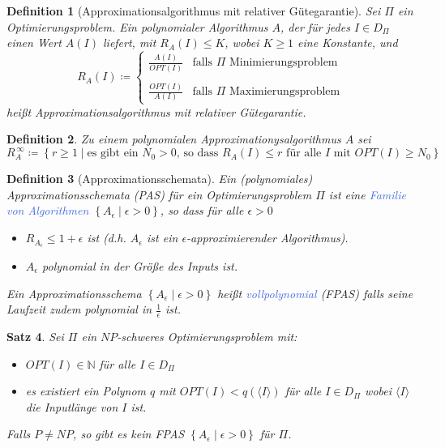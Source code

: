 \documentclass[11pt]{article}
\newcommand{\tcol}[1]{\textcolor{RoyalBlue}{#1}}
\newcommand{\set}[1]{\left\lbrace #1\right\rbrace}
\theoremstyle{break}
\newtheorem{satz}{Satz}[section]
\newtheorem{defi}[satz]{Definition}
\begin{document}
    \begin{defi}[Approximationsalgorithmus mit relativer Gütegarantie]
        Sei $\Pi$ ein Optimierungsproblem.
        Ein polynomialer Algorithmus $A$, der für jedes $I\in D_\Pi$ einen Wert $A(I)$ liefert, mit $R_A(I)\leq K$, wobei $K\geq 1$ eine Konstante, und
        \[R_A(I)\coloneqq
        \begin{cases}
            \frac{A(I)}{OPT(I)} & \text{falls $\Pi$ Minimierungsproblem}\\
            & \\
            \frac{OPT(I)}{A(I)} & \text{falls $\Pi$ Maximierungsproblem}
        \end{cases}
        \]
        heißt Approximationsalgorithmus mit relativer Gütegarantie.
    \end{defi}

    \begin{defi}
        Zu einem polynomialen Approximationysalgorithmus $A$ sei
        \[R^{\,\infty}_A\coloneqq\set{r\geq 1 \mid\text{es gibt ein $N_0>0$, so dass $R_A(I)\leq r$ für alle $I$ mit $OPT(I)\geq N_0$}}\]
    \end{defi}

    \begin{defi}[Approximationsschemata]
        Ein (polynomiales) Approximationsschemata (PAS) für ein Optimierungsproblem $\Pi$ ist eine \tcol{Familie von Algorithmen} $\set{A_\epsilon\mid\epsilon>0}$, so dass für alle $\epsilon>0$
        \begin{itemize}
            \item $R_{A_\epsilon}\leq 1+\epsilon$ ist (d.h. $A_\epsilon$ ist ein $\epsilon$-approximierender Algorithmus).
            \item $A_\epsilon$ polynomial in der Größe des Inputs ist.
        \end{itemize}
        Ein Approximationsschema $\set{A_\epsilon\mid\epsilon>0}$ heißt \tcol{vollpolynomial} (FPAS) falls seine Laufzeit zudem polynomial in $\frac{1}{\epsilon}$ ist.
    \end{defi}

    \begin{satz}
        Sei $\Pi$ ein $NP$-schweres Optimierungsproblem mit:
        \begin{itemize}
            \item $OPT(I)\in\mathbb{N}$ für alle $I\in D_\Pi$
            \item es existiert ein Polynom $q$ mit $OPT(I)<q(\langle I\rangle)$ für alle $I\in D_\Pi$ wobei $\langle I\rangle$ die Inputlänge von $I$ ist.
        \end{itemize}
        Falls $P\neq NP$, so gibt es kein FPAS $\set{A_\epsilon\mid\epsilon>0}$ für $\Pi$.
    \end{satz}
\end{document}
